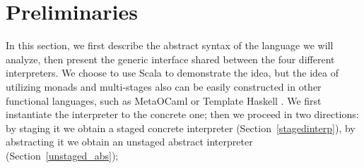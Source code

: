 \newcommand{\TLang}{$L_\lambda$}

\section{Preliminaries}

In this section, we first describe the abstract syntax of the language we will
analyze, then present the generic interface shared between the four different
interpreters. We choose to use Scala to demonstrate the idea, but the idea of
utilizing monads and multi-stages also can be easily constructed in other functional
languages, such as MetaOCaml \cite{DBLP:conf/gpce/CalcagnoTHL03,
  DBLP:conf/flops/Kiselyov14} or Template Haskell \cite{Sheard:2002:TMH:636517.636528}.
We first instantiate the interpreter to the concrete one; then we
proceed in two directions: by staging it we obtain a staged concrete interpreter
(Section~\ref{stagedinterp}), by abstracting it we obtain an unstaged abstract
interpreter (Section~\ref{unstaged_abs});




